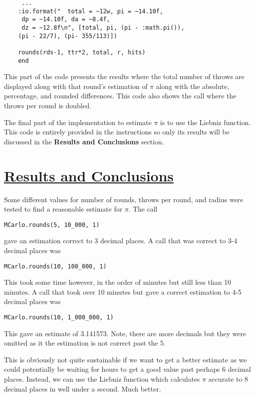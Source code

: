\documentclass[a4paper,11pt]{article}
\begin{document}
 \begin{verbatim}
     ...
    :io.format("  total = ~12w, pi = ~14.10f, 
     dp = ~14.10f, da = ~8.4f,
     dz = ~12.8f\n", [total, pi, (pi - :math.pi()),
    (pi - 22/7), (pi- 355/113)])

    rounds(rds-1, ttr*2, total, r, hits)
    end
\end{verbatim}
This part of the code presents the results where the total number of throws are displayed along with that round's estimation of $\pi$ along with the absolute, percentage, and rounded differences. This code also shows the call where the throws per round is doubled.

The final part of the implementation to estimate $\pi$ is to use the Liebniz function. This code is entirely provided in the instructions so only its results will be discussed in the \textbf{Results and Conclusions} section.


\section*{
	\underline{Results and Conclusions}
}
Some different values for number of rounds, throws per round, and radius were tested to find a reasonable estimate for $\pi$. The call
\begin{verbatim}
MCarlo.rounds(5, 10_000, 1)
\end{verbatim}
gave an estimation correct to 3 decimal places. A call that was correct to 3-4 decimal places was
\begin{verbatim}
MCarlo.rounds(10, 100_000, 1)
\end{verbatim}
This took some time however, in the order of minutes but still less than 10 minutes. A call that took over 10 minutes but gave a correct estimation to 4-5 decimal places was 
\begin{verbatim}
MCarlo.rounds(10, 1_000_000, 1)
\end{verbatim}
This gave an estimate of 3.141573. Note, there are more decimals but they were omitted as it the estimation is not correct past the 5.

This is obviously not quite sustainable if we want to get a better estimate as we could potentially be waiting for hours to get a good value past perhaps 6 decimal places. Instead, we can use the Liebniz function which calculates $\pi$ accurate to 8 decimal places in well under a second. Much better.
\end{document}
